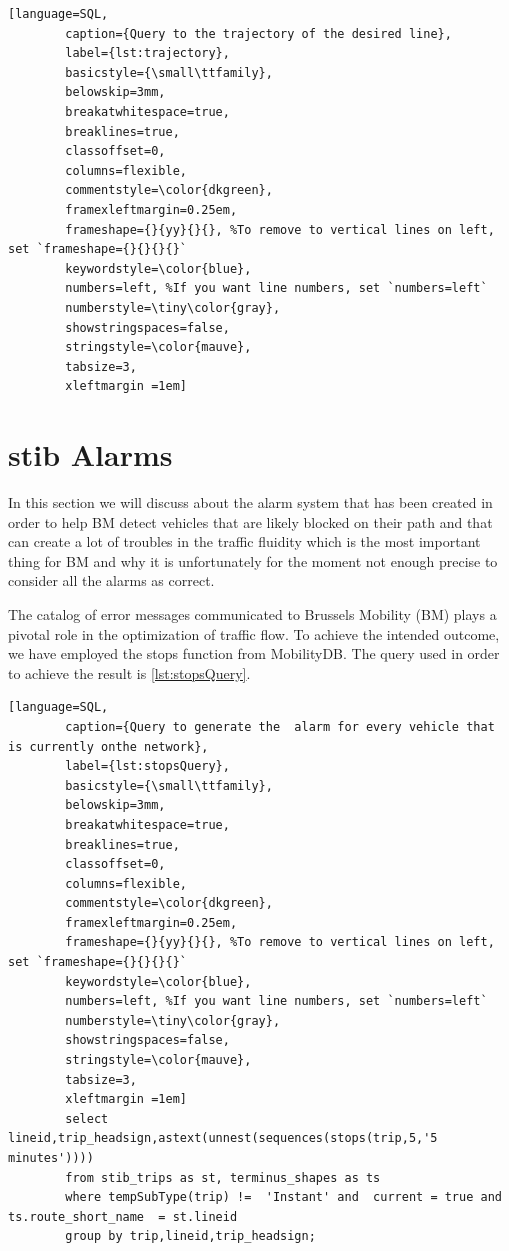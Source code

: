\documentclass[12pt]{report}
\begin{document}
	\begin{lstlisting}[language=SQL,
		caption={Query to the trajectory of the desired line},
		label={lst:trajectory},
		basicstyle={\small\ttfamily},
		belowskip=3mm,
		breakatwhitespace=true,
		breaklines=true,
		classoffset=0,
		columns=flexible,
		commentstyle=\color{dkgreen},
		framexleftmargin=0.25em,
		frameshape={}{yy}{}{}, %To remove to vertical lines on left, set `frameshape={}{}{}{}`
		keywordstyle=\color{blue},
		numbers=left, %If you want line numbers, set `numbers=left`
		numberstyle=\tiny\color{gray},
		showstringspaces=false,
		stringstyle=\color{mauve},
		tabsize=3,
		xleftmargin =1em]
	\end{lstlisting}
		
	
	\section{\acrshort{stib} Alarms}
	
	In this section we will discuss about the alarm system that has been created in order to help BM detect vehicles that are likely blocked on their path and that can create a lot of troubles in the traffic fluidity which is the most important thing for BM and why it is unfortunately for the moment not enough precise to consider all the alarms as correct.
	
	The catalog of error messages communicated to Brussels Mobility (BM) plays a pivotal role in the optimization of traffic flow. To achieve the intended outcome, we have employed the stops function from MobilityDB. The query used in order to achieve the  result is \ref{lst:stopsQuery}. 
	
		\begin{lstlisting}[language=SQL,
		caption={Query to generate the  alarm for every vehicle that is currently onthe network},
		label={lst:stopsQuery},
		basicstyle={\small\ttfamily},
		belowskip=3mm,
		breakatwhitespace=true,
		breaklines=true,
		classoffset=0,
		columns=flexible,
		commentstyle=\color{dkgreen},
		framexleftmargin=0.25em,
		frameshape={}{yy}{}{}, %To remove to vertical lines on left, set `frameshape={}{}{}{}`
		keywordstyle=\color{blue},
		numbers=left, %If you want line numbers, set `numbers=left`
		numberstyle=\tiny\color{gray},
		showstringspaces=false,
		stringstyle=\color{mauve},
		tabsize=3,
		xleftmargin =1em]
		select  lineid,trip_headsign,astext(unnest(sequences(stops(trip,5,'5 minutes'))))
		from stib_trips as st, terminus_shapes as ts
		where tempSubType(trip) !=  'Instant' and  current = true and  ts.route_short_name  = st.lineid
		group by trip,lineid,trip_headsign;
	\end{lstlisting}
	
\end{document}
